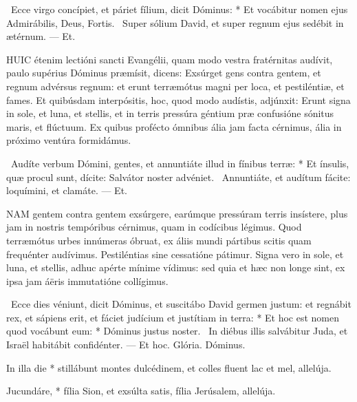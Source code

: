 \R\ Ecce virgo concípiet, et páriet fílium, dicit Dóminus: * Et vocábitur nomen ejus Admirábilis, Deus, Fortis. \V\ Super sólium David, et super regnum ejus sedébit in ætérnum. --- Et.


\lettrine[lines=2]{H}{UIC} étenim lectióni sancti Evangélii, quam modo vestra fratérnitas audívit, paulo supérius Dóminus præmísit, dicens: Exsúrget gens contra gentem, et regnum advérsus regnum: et erunt terræmótus magni per loca, et pestiléntiæ, et fames. Et quibúsdam interpósitis, hoc, quod modo audístis, adjúnxit: Erunt signa in sole, et luna, et stellis, et in terris pressúra géntium præ confusióne sónitus maris, et flúctuum. Ex quibus profécto ómnibus ália jam facta cérnimus, ália in próximo ventúra formidámus.

\R\ Audíte verbum Dómini, gentes, et annuntiáte illud in fínibus terræ: * Et ínsulis, quæ procul sunt, dícite: Salvátor noster advéniet. \V\ Annuntiáte, et audítum fácite: loquímini, et clamáte. --- Et.


\lettrine[lines=2]{N}{AM} gentem contra gentem exsúrgere, earúmque pressúram terris insístere, plus jam in nostris tempóribus cérnimus, quam in codícibus légimus. Quod terræmótus urbes innúmeras óbruat, ex áliis mundi pártibus scitis quam frequénter audívimus. Pestiléntias sine cessatióne pátimur. Signa vero in sole, et luna, et stellis, adhuc apérte mínime vídimus: sed quia et hæc non longe sint, ex ipsa jam áëris immutatióne collígimus.

\R\ Ecce dies véniunt, dicit Dóminus, et suscitábo David germen justum: et regnábit rex, et sápiens erit, et fáciet judícium et justítiam in terra: * Et hoc est nomen quod vocábunt eum: * Dóminus justus noster. \V\ In diébus illis salvábitur Juda, et Israël habitábit confidénter. --- Et hoc. Glória. Dóminus.




 In illa die * stillábunt montes dulcédinem, et colles fluent lac et mel, allelúja.


 Jucundáre, * fília Sion, et exsúlta satis, fília Jerúsalem, allelúja.


